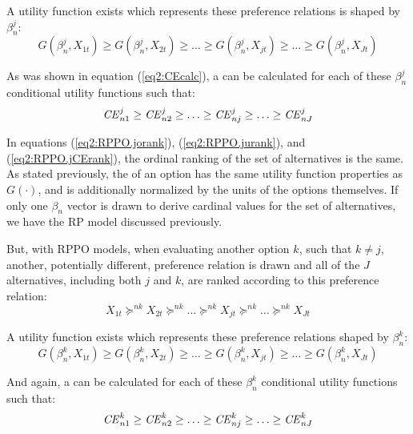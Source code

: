 \documentclass[../main.tex]{subfiles}
\begin{document}
\noindent A utility function exists which represents these preference relations is shaped by $\beta_n^j$:
\begin{equation}
	\label{eq2:RPPO.jurank}
	G(\beta_n^j,X_{1t}) \geq G(\beta_n^j,X_{2t}) \geq \ldots \geq G(\beta_n^j,X_{jt}) \geq \ldots \geq G(\beta_n^j,X_{Jt})
\end{equation}

As was shown in equation (\ref{eq2:CEcalc}), a {\CE} can be calculated for each of these $\beta_n^j$ conditional utility functions such that:
\begin{equation}
	\label{eq2:RPPO.jCErank}
	{\ensuremath{\mathit{CE}}}^j_{n1} \geq {\ensuremath{\mathit{CE}}}^j_{n2} \geq \ldots \geq {\ensuremath{\mathit{CE}}}^j_{nj} \geq \ldots \geq {\ensuremath{\mathit{CE}}}^j_{nJ}
\end{equation}

In equations (\ref{eq2:RPPO.jorank}), (\ref{eq2:RPPO.jurank}), and (\ref{eq2:RPPO.jCErank}), the ordinal ranking of the set of alternatives is the same.
As stated previously, the {\CE} of an option has the same utility function properties as $G(\cdot)$, and is additionally normalized by the units of the options themselves.
If only one $\beta_n$ vector is drawn to derive cardinal values for the set of alternatives, we have the RP model discussed previously.

But, with RPPO models, when evaluating another option $k$, such that $k \neq j$, another, potentially different, preference relation is drawn and all of the $J$ alternatives, including both $j$ and $k$, are ranked according to this preference relation:
\begin{equation}
	\label{eq2:RPPO.korank}
	X_{1t} \succcurlyeq^{nk} X_{2t} \succcurlyeq^{nk} \ldots \succcurlyeq^{nk} X_{jt} \succcurlyeq^{nk} \ldots \succcurlyeq^{nk} X_{Jt}
\end{equation}

\noindent A utility function exists which represents these preference relations shaped by $\beta_n^k$:
\begin{equation}
	\label{eq2:RPPO.kurank}
	G(\beta_n^k,X_{1t}) \geq G(\beta_n^k,X_{2t}) \geq \ldots \geq G(\beta_n^k,X_{jt}) \geq \ldots \geq G(\beta_n^k,X_{Jt})
\end{equation}

\noindent And again, a {\CE} can be calculated for each of these $\beta_n^k$ conditional utility functions such that:
\begin{equation}
	\label{eq2:RPPO.kCErank}
	{\ensuremath{\mathit{CE}}}^k_{n1} \geq {\ensuremath{\mathit{CE}}}^k_{n2} \geq \ldots \geq {\ensuremath{\mathit{CE}}}^k_{nj} \geq \ldots \geq {\ensuremath{\mathit{CE}}}^k_{nJ}
\end{equation}
\end{document}

